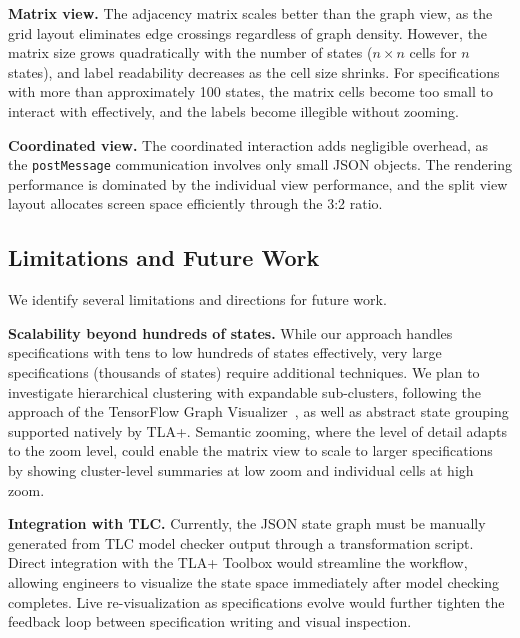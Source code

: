 \documentclass[conference]{IEEEtran}
\begin{document}
\textbf{Matrix view.} The adjacency matrix scales better than the graph view, as the grid layout eliminates edge crossings regardless of graph density. However, the matrix size grows quadratically with the number of states ($n \times n$ cells for $n$ states), and label readability decreases as the cell size shrinks. For specifications with more than approximately 100 states, the matrix cells become too small to interact with effectively, and the labels become illegible without zooming.

\textbf{Coordinated view.} The coordinated interaction adds negligible overhead, as the \texttt{postMessage} communication involves only small JSON objects. The rendering performance is dominated by the individual view performance, and the split view layout allocates screen space efficiently through the 3:2 ratio.

\subsection{Limitations and Future Work}

We identify several limitations and directions for future work.

\textbf{Scalability beyond hundreds of states.} While our approach handles specifications with tens to low hundreds of states effectively, very large specifications (thousands of states) require additional techniques. We plan to investigate hierarchical clustering with expandable sub-clusters, following the approach of the TensorFlow Graph Visualizer~\cite{wongsuphasawat2018tensorflow}, as well as abstract state grouping supported natively by TLA+. Semantic zooming, where the level of detail adapts to the zoom level, could enable the matrix view to scale to larger specifications by showing cluster-level summaries at low zoom and individual cells at high zoom.

\textbf{Integration with TLC.} Currently, the JSON state graph must be manually generated from TLC model checker output through a transformation script. Direct integration with the TLA+ Toolbox would streamline the workflow, allowing engineers to visualize the state space immediately after model checking completes. Live re-visualization as specifications evolve would further tighten the feedback loop between specification writing and visual inspection.
\end{document}
